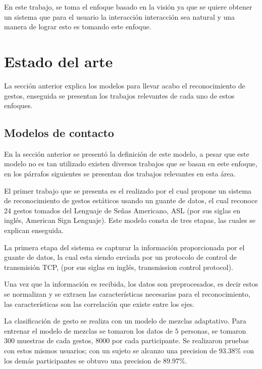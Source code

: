 En este trabajo, se toma el enfoque basado en la visión ya que se quiere obtener un sistema que para el usuario la interacción interacción sea natural y una manera de lograr esto es tomando este enfoque.  



\section{Estado del arte}\label{sec:EstadoDelArte} 

La sección anterior explica los modelos para llevar acabo el reconocimiento de gestos, enseguida se presentan los trabajos relevantes de cada uno de estos enfoques. 

\subsection{Modelos de contacto}
 
En la sección anterior se presentó la definición de este modelo, a pesar que este modelo no es tan utilizado existen diversos trabajos que se basan en este enfoque, en los párrafos siguientes se presentan dos trabajos relevantes en esta área. 

El primer trabajo que se presenta es el realizado por \citep{Yoon2012} el cual propone un sistema de reconocimiento de gestos estáticos usando un guante de datos, el cual reconoce 24 gestos tomados del Lenguaje de Señas Americano, ASL (por sus siglas en inglés, American Sign Lenguaje). Este modelo consta de tres etapas, las cuales se explican enseguida. 

La primera etapa del sistema es capturar la información proporcionada por el guante de datos, la cual esta siendo enviada por un protocolo de control de transmisión TCP, (por sus siglas en inglés, transmission control protocol). 
 
Una vez que la información es recibida, los datos son preprocesados, es decir estos se normalizan y se extraen las características necesarias para el reconocimiento, las características son las correlación que existe entre los ejes.    
 
La clasificación de gesto se realiza con un modelo de mezclas adaptativo. Para entrenar el modelo de mezclas se tomaron los datos de $5$ personas, se tomaron $300$ muestras de cada gestos, $8000$ por cada participante. Se realizaron pruebas con estos mismos usuarios; con un sujeto se alcanzo una precision de $93.38 \%$ con los demás participantes se obtuvo una precision de $89.97  \%$.  

